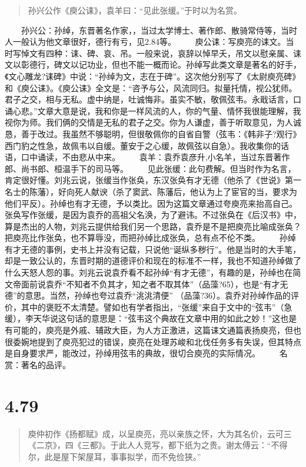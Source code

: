 \documentclass[]{book}
\begin{document}
\begin{quote}
孙兴公作《庾公诔》，袁羊曰：``见此张缓。''于时以为名赏。
\end{quote}

　　孙兴公：孙绰，东晋著名作家，，当过太学博士、著作郎、散骑常侍等，当时人一般认为他文章很好，德行有亏，见2.84等。
　　庾公诔：写庾亮的诔文。当时写悼文有四种：诔、碑、哀、吊。一般来说，哀辞以悼早夭，吊文以慰亲属、诔文以彰德行，碑文以记功业，但也不能一概而论。孙绰写此类文章是著名的好手，《文心雕龙?诔碑》中说：``孙绰为文，志在于碑''。这次他分别写了《太尉庾亮碑》和《庾公诔》。《庾公诔》全文是：``咨予与公，风流同归。拟量托情，视公犹师。君子之交，相与无私。虚中纳是，吐诚悔非。虽实不敏，敬佩弦韦。永戢话言，口诵心悲。''文章大意是说，我和你是一样风流的人，你的气量、情怀我很能理解，我视你为师。我们俩的交情是无私的君子之交。你为人谦虚，善于听取意见，为人诚恳，善于改过。我虽然不够聪明，但很敬佩你的自省自警（弦韦：《韩非子?观行》西门豹之性急，故佩韦以自缓。董安于之心缓，故佩弦以自急）。我收集你的话语，口中诵读，不由悲从中来。
　　袁羊：袁乔袁彦升,小名羊，当过东晋著作郎、尚书郎、桓温手下的司马等。
　　见此张缓：此句费解。但当时作为名言，肯定很好懂。刘兆云说，张缓当作张奂，东汉张奂有才无德（他杀了《世说》第一名士的陈藩），好向死人献谀（杀了窦武、陈藩后，他认为上了宦官的当，要求为他们平反）。孙绰也有才无德，予以类比。因为这篇文章通过夸庾亮来抬高自己。张奂写作张缓，是因为袁乔的高祖父名涣，为了避讳。不过张奂在《后汉书》中，算是杰出的人物，刘兆云提供给我们另一个思路，袁乔是不是把庾亮比喻成张奂？把庾亮比作张奂，也不算辱没，而把孙绰比成张奂，总有点不伦不类。
　　孙绰有才无德的事例，史书上并没有记载，只说他``诞纵多秽行''。他是当时的大手笔，却是一致公认的，东晋时期的道德评价和现在的标准不一样，我也不知道孙绰做了什么天怒人怨的事。刘兆云说袁乔看不起孙绰``有才无德''，有趣的是，孙绰也在简文帝面前说袁乔``不知者不负其才，知之者不取其体''（品藻?65），也是``有才无德''的意思。当然，孙绰也夸过袁乔``洮洮清便''
（品藻?36）。袁乔对孙绰作品的评价，其中的褒贬不太清楚。譬如也有学者指出，``张缓''来自于文中的``弦韦''（急缓），李天华说这句话的意思是：``弦韦这个典故在文章中用的如此之妙！''这也是有可能的，庾亮是外戚、辅政大臣，为人方正激进，这篇诔文通篇表扬庾亮，但也很委婉地提到了庾亮犯过的错误，庾亮在处理苏峻和北伐任务多有失误，但其特点是自身要求严，能改过，孙绰用弦韦的典故，很切合庾亮的实际情况。
　　名赏：著名的品评。

\section{4.79}\label{section-256}

\begin{quote}
庾仲初作《扬都赋》成，以呈庾亮，亮以亲族之怀，大为其名价，云可三《二京》，四《三都》。于此人人竞写，都下纸为之贵。谢太傅云：``不得尔，此是屋下架屋耳，事事拟学，而不免俭狭。''
\end{quote}
\end{document}
